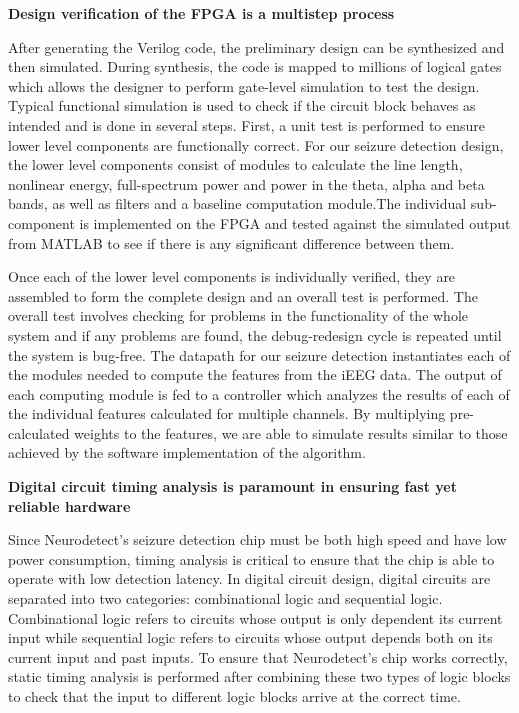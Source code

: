 \documentclass[usletter, 11pt]{extarticle}
\begin{document}
\vspace{11pt}
\textbf{Design verification of the FPGA is a multistep process}
 
After generating the Verilog code, the preliminary design can be synthesized and then simulated. During synthesis, the code is mapped to millions of logical gates which allows the designer to perform gate-level simulation to test the design. Typical functional simulation is used to check if the circuit block behaves as intended and is done in several steps. First, a unit test is performed to ensure lower level components are functionally correct. For our seizure detection design, the lower level components consist of modules to calculate the line length, nonlinear energy, full-spectrum power and power in the theta, alpha and beta bands, as well as filters and a baseline computation module.The individual sub-component is implemented on the FPGA and tested against the simulated output from MATLAB to see if there is any significant difference between them.

Once each of the lower level components is individually verified, they are assembled to form the complete design and an overall test is performed. The overall test involves checking for problems in the functionality of the whole system and if any problems are found, the debug-redesign cycle is repeated until the system is bug-free. The datapath for our seizure detection instantiates each of the modules needed to compute the features from the iEEG data. The output of each computing module is fed to a controller which analyzes the results of each of the individual features calculated for multiple channels. By multiplying pre-calculated weights to the features, we are able to simulate results similar to those achieved by the software implementation of the algorithm. 

\vspace{11pt}
\textbf{Digital circuit timing analysis is paramount in ensuring fast yet reliable hardware }
 
Since Neurodetect's seizure detection chip must be both high speed and have low power consumption, timing analysis is critical to ensure that the chip is able to operate with low detection latency. In digital circuit design, digital circuits are separated into two categories: combinational logic and sequential logic. Combinational logic refers to circuits whose output is only dependent its current input while sequential logic refers to circuits whose output depends both on its current input and past inputs. To ensure that Neurodetect's chip works correctly, static timing analysis is performed after combining these two types of logic blocks to check that the input to different logic blocks arrive at the correct time.
\end{document}
